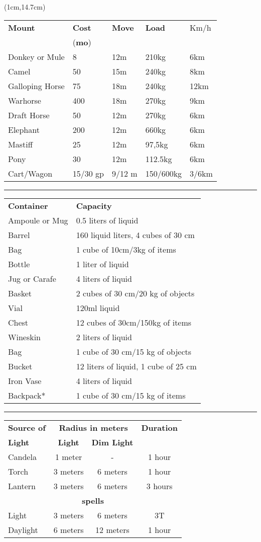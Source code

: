 \documentclass[a4paper,12 pt,openany]{book}
\newcommand{\linex}{\rule{\textwidth}{0.4pt}}
\begin{document}
\begin{textblock*}{12cm}(1cm,14.7cm) %

\begin{tabular}{lllll}
\hline
\textbf{Mount}&\textbf{Cost}&\textbf{Move}&\textbf{Load}&Km/h\\
&(\textbf{mo})&&&\\
Donkey or Mule&8&12m&210kg&6km\\
Camel&50&15m&240kg&8km\\
Galloping Horse&75&18m&240kg&12km\\
Warhorse&400&18m&270kg&9km\\
Draft Horse&50&12m&270kg&6km\\
Elephant&200&12m&660kg&6km\\
Mastiff&25&12m&97,5kg&6km\\
Pony&30&12m&112.5kg&6km\\
Cart/Wagon & 15/30 gp & 9/12 m &150/600kg & 3/6km \\
\end{tabular}

\linex

\begin{tabular}{ll}

\textbf{Container}&\textbf{Capacity}\\
Ampoule or Mug&0.5 liters of liquid\\
Barrel& 160 liquid liters, 4 cubes of 30 cm\\
Bag& 1 cube of 10cm/3kg of items\\
Bottle& 1 liter of liquid\\
Jug or Carafe&4 liters of liquid\\
Basket& 2 cubes of 30 cm/20 kg of objects\\
Vial & 120ml liquid\\
Chest& 12 cubes of 30cm/150kg of items\\
Wineskin & 2 liters of liquid\\
Bag& 1 cube of 30 cm/15 kg of objects\\
Bucket & 12 liters of liquid, 1 cube of 25 cm\\
Iron Vase & 4 liters of liquid\\
Backpack*& 1 cube of 30 cm/15 kg of items\\
\end{tabular}

\linex


\begin{tabular}{l|cc|c}
	\textbf{Source of} &\multicolumn{2}{c}{\textbf{Radius in meters}}& \textbf{Duration} \\
	\textbf{Light}& \textbf{Light} & \textbf{Dim Light} &\\
	Candela & 1 meter & - & 1 hour\\
	Torch & 3 meters & 6 meters & 1 hour\\
	Lantern & 3 meters & 6 meters & 3 hours \\
	\multicolumn{4}{c}{\textbf{spells}}\\
	Light & 3 meters & 6 meters &3T \\
	Daylight & 6 meters & 12 meters & 1 hour \\
\end{tabular}


\end{textblock*}
\end{document}
